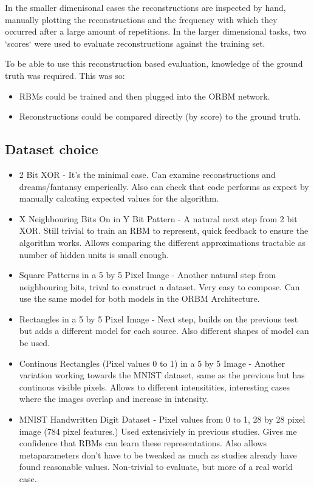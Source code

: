 In the smaller dimenisonal cases the reconstructions are inspected by hand, manually plotting the reconstructions and the frequency with which they occurred after a large amount of repetitions. In the larger dimensional tasks, two `scores` were used to evaluate reconstructions against the training set.

To be able to use this reconstruction based evaluation, knowledge of the ground truth was required. This was so:
\begin{itemize}
  \item RBMs could be trained and then plugged into the ORBM network.
  \item Reconstructions could be compared directly (by score) to the ground truth.
\end{itemize}


\subsection{Dataset choice}
\begin{itemize}
  \item 2 Bit XOR - It's the minimal case. Can examine reconstructions and dreams/fantansy emperically. Also can check that code performs as expect by manually calcating expected values for the algorithm.
  \item X Neighbouring Bits On in Y Bit Pattern - A natural next step from 2 bit XOR. Still trivial to train an RBM to represent, quick feedback to ensure the algorithm works. Allows comparing the different approximations tractable as number of hidden units is small enough.
  \item Square Patterns in a 5 by 5 Pixel Image - Another natural step from neighbouring bits, trival to construct a dataset. Very easy to compose. Can use the same model for both models in the ORBM Architecture.
  \item Rectangles in a 5 by 5 Pixel Image - Next step, builds on the previous test but adds a different model for each source. Also different shapes of model can be used.
  \item Continous Rectangles (Pixel values 0 to 1) in a 5 by 5 Image - Another variation working towards the MNIST dataset, same as the previous but has continous visible pixels. Allows to different intensitities, interesting cases where the images overlap and increase in intensity.
  \item MNIST Handwritten Digit Dataset - Pixel values from 0 to 1, 28 by 28 pixel image (784 pixel features.) Used extensiviely in previous studies. Gives me confidence that RBMs can learn these representations. Also allows metaparameters don't have to be tweaked as much as studies already have found reasonable values. Non-trivial to evaluate, but more of a real world case.
\end{itemize}



